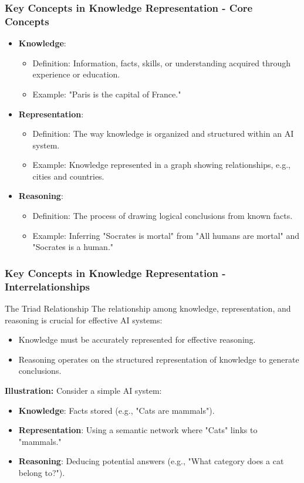 \documentclass[aspectratio=169]{beamer}
\begin{document}
\begin{frame}[fragile]
    \frametitle{Key Concepts in Knowledge Representation - Core Concepts}
    \begin{itemize}
        \item \textbf{Knowledge}: 
        \begin{itemize}
            \item Definition: Information, facts, skills, or understanding acquired through experience or education.
            \item Example: "Paris is the capital of France."
        \end{itemize}
        
        \item \textbf{Representation}: 
        \begin{itemize}
            \item Definition: The way knowledge is organized and structured within an AI system.
            \item Example: Knowledge represented in a graph showing relationships, e.g., cities and countries.
        \end{itemize}
        
        \item \textbf{Reasoning}: 
        \begin{itemize}
            \item Definition: The process of drawing logical conclusions from known facts.
            \item Example: Inferring "Socrates is mortal" from "All humans are mortal" and "Socrates is a human."
        \end{itemize}
    \end{itemize}
\end{frame}

\begin{frame}[fragile]
    \frametitle{Key Concepts in Knowledge Representation - Interrelationships}
    \begin{block}{The Triad Relationship}
        The relationship among knowledge, representation, and reasoning is crucial for effective AI systems:
        \begin{itemize}
            \item Knowledge must be accurately represented for effective reasoning.
            \item Reasoning operates on the structured representation of knowledge to generate conclusions.
        \end{itemize}
    \end{block}
    
    \textbf{Illustration:} Consider a simple AI system:
    \begin{itemize}
        \item \textbf{Knowledge}: Facts stored (e.g., "Cats are mammals").
        \item \textbf{Representation}: Using a semantic network where "Cats" links to "mammals."
        \item \textbf{Reasoning}: Deducing potential answers (e.g., "What category does a cat belong to?").
    \end{itemize}
\end{frame}
\end{document}

